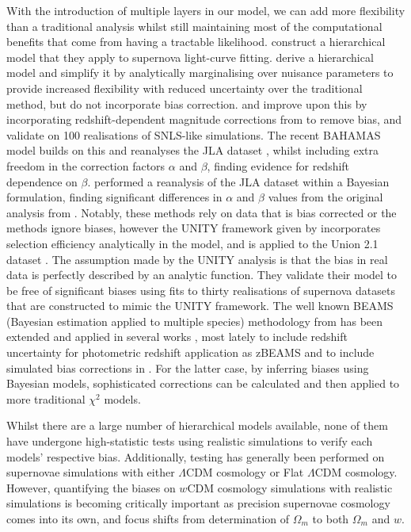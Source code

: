 \documentclass[a4paper,fleqn,usenatbib]{emulateapj}
\begin{document}
With the introduction of multiple layers in our model, we can add more flexibility than a traditional analysis whilst still maintaining most of the computational benefits that come from having a tractable likelihood. \citet{Mandel2009, Mandel2011a, Mandel2017} construct a hierarchical model that they apply to supernova light-curve fitting. \citet{March2011} derive a hierarchical model and simplify it by analytically marginalising over nuisance parameters to provide increased flexibility with reduced uncertainty over the traditional method, but do not incorporate bias correction. \citet{March2014} and \citet{Karpenka2015} improve upon this by incorporating redshift-dependent magnitude corrections from \citet{Perrett2010} to remove bias, and validate on 100 realisations of SNLS-like simulations. The recent BAHAMAS model \citep{Shariff2016} builds on this and reanalyses the JLA dataset \citep[using redshift dependent bias corrections from][]{Betoule2014}, whilst including extra freedom in the correction factors $\alpha$ and $\beta$, finding evidence for redshift dependence on $\beta$. \citet{Ma2016} performed a reanalysis of the JLA dataset within a Bayesian formulation, finding significant differences in $\alpha$ and $\beta$ values from the original analysis from \citet{Betoule2014}. Notably, these methods rely on data that is bias corrected or the methods ignore biases, however the UNITY framework given by \citet{Rubin2015} incorporates selection efficiency analytically in the model, and is applied to the Union 2.1 dataset \citep{Suzuki2012}. The assumption made by the UNITY analysis is that the bias in real data is perfectly described by an analytic function. They validate their  model to be free of significant biases using fits to thirty realisations of supernova datasets that are constructed to mimic the UNITY framework. The well known BEAMS (Bayesian estimation applied to multiple species) methodology from \citet{Kunz2007} has been extended and applied in several works \citep{Hlozek2012}, most lately to include redshift uncertainty for photometric redshift application as zBEAMS \citep{Roberts2017} and to include simulated bias corrections in \citet{Kessler2017}. For the latter case, by inferring biases using Bayesian models, sophisticated corrections can be calculated and then applied to more traditional $\chi^2$ models.


Whilst there are a large number of hierarchical models available, none of them have undergone high-statistic tests using realistic simulations to verify each models' respective bias. Additionally, testing has generally been performed on supernovae simulations with either $\Lambda$CDM cosmology or Flat $\Lambda$CDM cosmology. However, quantifying the biases on $w$CDM cosmology simulations with realistic simulations is becoming critically important as precision supernovae cosmology comes into its own, and focus shifts from determination of $\Omega_m$ to both $\Omega_m$ and $w$.
\end{document}
